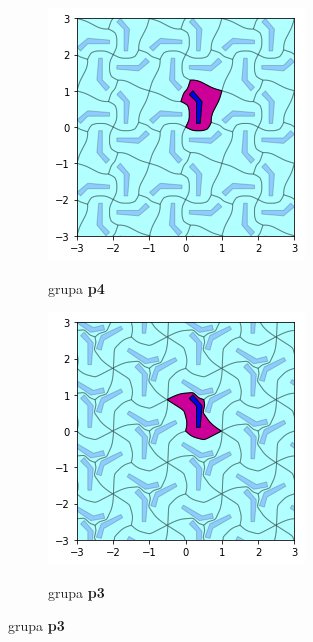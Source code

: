 \documentclass[11pt]{article}
\begin{document}
\begin{samepage}
\begin{figure}[H]
  \begin{subfigure}[b]{0.3\textwidth}
    \includegraphics[width=\textwidth]{output_21_4.png}
    \label{fig:f23}
    \caption{grupa \textbf{p4}}
  \end{subfigure}
  \begin{subfigure}[b]{0.3\textwidth}
    \includegraphics[width=\textwidth]{output_21_3.png}
    \label{fig:f22}
    \caption{grupa \textbf{p3}}
  

\end{subfigure}
\end{figure}
\end{samepage}
\end{document}
